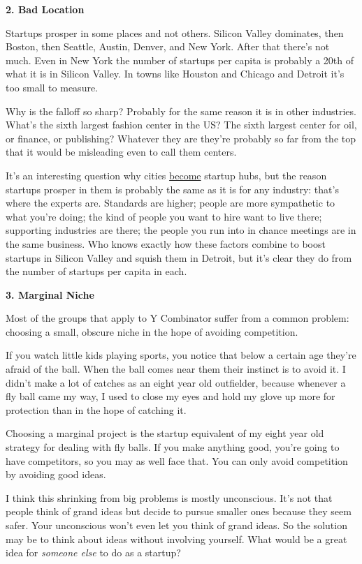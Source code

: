\textbf{2. Bad Location}

Startups prosper in some places and not others. Silicon Valley
dominates, then Boston, then Seattle, Austin, Denver, and New York.
After that there's not much. Even in New York the number of startups per
capita is probably a 20th of what it is in Silicon Valley. In towns like
Houston and Chicago and Detroit it's too small to measure.

Why is the falloff so sharp? Probably for the same reason it is in other
industries. What's the sixth largest fashion center in the US? The sixth
largest center for oil, or finance, or publishing? Whatever they are
they're probably so far from the top that it would be misleading even to
call them centers.

It's an interesting question why cities
\href{siliconvalley.html}{become} startup hubs, but the reason startups
prosper in them is probably the same as it is for any industry: that's
where the experts are. Standards are higher; people are more sympathetic
to what you're doing; the kind of people you want to hire want to live
there; supporting industries are there; the people you run into in
chance meetings are in the same business. Who knows exactly how these
factors combine to boost startups in Silicon Valley and squish them in
Detroit, but it's clear they do from the number of startups per capita
in each.

\textbf{3. Marginal Niche}

Most of the groups that apply to Y Combinator suffer from a common
problem: choosing a small, obscure niche in the hope of avoiding
competition.

If you watch little kids playing sports, you notice that below a certain
age they're afraid of the ball. When the ball comes near them their
instinct is to avoid it. I didn't make a lot of catches as an eight year
old outfielder, because whenever a fly ball came my way, I used to close
my eyes and hold my glove up more for protection than in the hope of
catching it.

Choosing a marginal project is the startup equivalent of my eight year
old strategy for dealing with fly balls. If you make anything good,
you're going to have competitors, so you may as well face that. You can
only avoid competition by avoiding good ideas.

I think this shrinking from big problems is mostly unconscious. It's not
that people think of grand ideas but decide to pursue smaller ones
because they seem safer. Your unconscious won't even let you think of
grand ideas. So the solution may be to think about ideas without
involving yourself. What would be a great idea for \emph{someone else}
to do as a startup?

